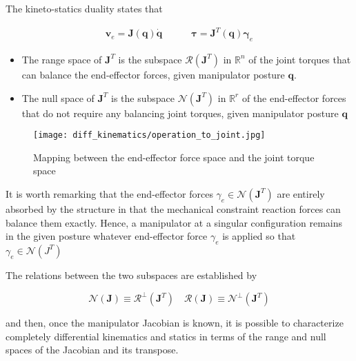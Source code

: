 \documentclass[10pt]{article}
\begin{document}
The kineto-statics duality states that

$$
\begin{aligned}
    \boldsymbol{v}_{e}=\boldsymbol{J}(\boldsymbol{q}) \dot{\boldsymbol{q}} \quad\quad\quad 
    \boldsymbol{\tau}=\boldsymbol{J}^{T}(\boldsymbol{q}) \boldsymbol{\gamma}_{e}
\end{aligned}
$$

\begin{itemize}
    \item The range space of $\boldsymbol{J}^{T}$ is the subspace $\mathcal{R}\left(\boldsymbol{J}^{T}\right)$ in $\mathbb{R}^{n}$ of the joint torques that can balance the end-effector forces,  given manipulator posture $\boldsymbol{q}$.

 \item The null space of $\boldsymbol{J}^{T}$ is the subspace $\mathcal{N}\left(\boldsymbol{J}^{T}\right)$ in $\mathbb{R}^{r}$ of the end-effector forces that do not require any balancing joint torques, given manipulator posture $\boldsymbol{q}$

\end{itemize}

\begin{figure}[H]
    \centering
    \texttt{[image: diff\_kinematics/operation\_to\_joint.jpg]}
    \caption{Mapping between the end-effector force space and the joint torque space}
    \label{fig:enter-label}
\end{figure}




It is worth remarking that the end-effector forces $\gamma_{e} \in \mathcal{N}\left(\boldsymbol{J}^{T}\right)$ are entirely absorbed by the structure in that the mechanical constraint reaction forces can balance them exactly. Hence, a manipulator at a singular configuration remains in the given posture whatever end-effector force $\gamma_{e}$ is applied so that $\gamma_{e} \in \mathcal{N}\left(J^{T}\right)$

The relations between the two subspaces are established by

$$
\mathcal{N}(\boldsymbol{J}) \equiv \mathcal{R}^{\perp}\left(\boldsymbol{J}^{T}\right) \quad \mathcal{R}(\boldsymbol{J}) \equiv \mathcal{N}^{\perp}\left(\boldsymbol{J}^{T}\right)
$$

and then, once the manipulator Jacobian is known, it is possible to characterize completely differential kinematics and statics in terms of the range and null spaces of the Jacobian and its transpose.
\end{document}
